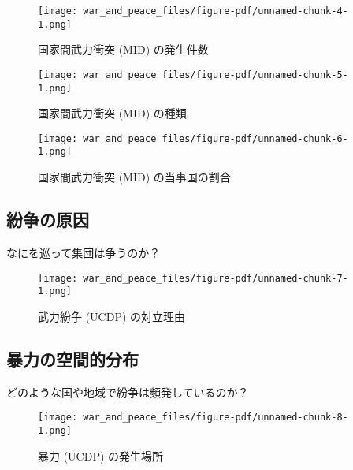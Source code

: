 \documentclass[
  xelatex,
  ja=standard]{bxjsarticle}
\begin{document}
\begin{figure}[htpb]

{\centering \texttt{[image: war\_and\_peace\_files/figure-pdf/unnamed-chunk-4-1.png]}

}

\caption{国家間武力衝突 (MID) の発生件数}

\end{figure}

\begin{figure}[htpb]

{\centering \texttt{[image: war\_and\_peace\_files/figure-pdf/unnamed-chunk-5-1.png]}

}

\caption{国家間武力衝突 (MID) の種類}

\end{figure}

\begin{figure}[htpb]

{\centering \texttt{[image: war\_and\_peace\_files/figure-pdf/unnamed-chunk-6-1.png]}

}

\caption{国家間武力衝突 (MID) の当事国の割合}

\end{figure}

\hypertarget{ux7d1bux4e89ux306eux539fux56e0}{%
\subsection{紛争の原因}\label{ux7d1bux4e89ux306eux539fux56e0}}

なにを巡って集団は争うのか？

\begin{figure}[htpb]

{\centering \texttt{[image: war\_and\_peace\_files/figure-pdf/unnamed-chunk-7-1.png]}

}

\caption{武力紛争 (UCDP) の対立理由}

\end{figure}

\hypertarget{ux66b4ux529bux306eux7a7aux9593ux7684ux5206ux5e03}{%
\subsection{暴力の空間的分布}\label{ux66b4ux529bux306eux7a7aux9593ux7684ux5206ux5e03}}

どのような国や地域で紛争は頻発しているのか？

\begin{figure}[htpb]

{\centering \texttt{[image: war\_and\_peace\_files/figure-pdf/unnamed-chunk-8-1.png]}

}

\caption{暴力 (UCDP) の発生場所}

\end{figure}
\end{document}
